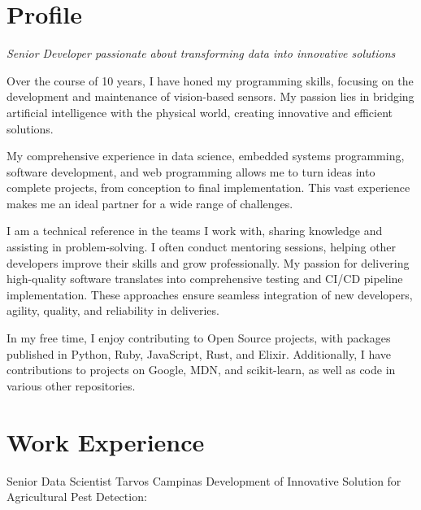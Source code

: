 \documentclass[11pt,a4paper,sans]{moderncv}        %
\begin{document}
\makecvtitle

\section{Profile}

\setlength{\parskip}{0.5em}
\textit {Senior Developer passionate about transforming data into innovative solutions} \par
\setlength{\parindent}{2em}

Over the course of 10 years, I have honed my programming skills, focusing on the development and maintenance of vision-based sensors. My passion lies in bridging artificial intelligence with the physical world, creating innovative and efficient solutions.

My comprehensive experience in data science, embedded systems programming, software development, and web programming allows me to turn ideas into complete projects, from conception to final implementation. This vast experience makes me an ideal partner for a wide range of challenges.

I am a technical reference in the teams I work with, sharing knowledge and assisting in problem-solving. I often conduct mentoring sessions, helping other developers improve their skills and grow professionally. My passion for delivering high-quality software translates into comprehensive testing and CI/CD pipeline implementation. These approaches ensure seamless integration of new developers, agility, quality, and reliability in deliveries.

In my free time, I enjoy contributing to Open Source projects, with packages published in Python, Ruby, JavaScript, Rust, and Elixir. Additionally, I have contributions to projects on Google, MDN, and scikit-learn, as well as code in various other repositories.

\setlength{\parindent}{0em}

\section{Work Experience}
{Senior Data Scientist}
{Tarvos}
{Campinas}{}
{Development of Innovative Solution for Agricultural Pest Detection:}
\end{document}
